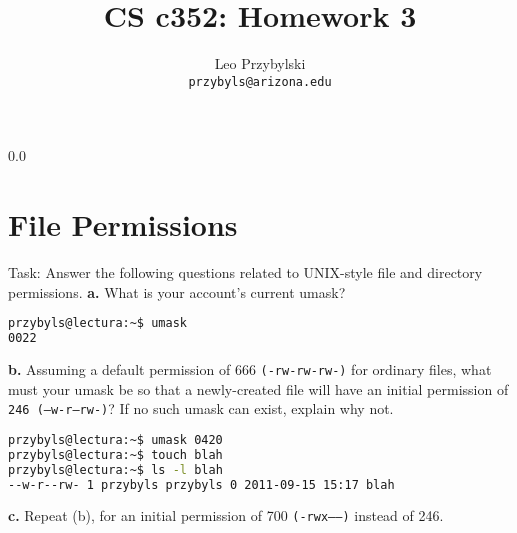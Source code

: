 \documentclass[11pt,notitlepage]{article}
\title{CS c352: Homework 3}
\author{Leo Przybylski\\
\texttt{przybyls@arizona.edu}}
\newcommand{\question}[2]{\textbf{#1.} #2}
\begin{document}
  \maketitle
  {\setlength{\baselineskip}%
           {0.0\baselineskip}
  \section*{File Permissions}
  \hrulefill \par}
Task: Answer the following questions related to UNIX-style ﬁle and directory permissions.
\question{a}{What is your account’s current umask?}

\begin{lstlisting}[language=bash,basicstyle=\scriptsize,backgroundcolor=\color{ubergray},caption={trnapp-config.xml},frame=single,breaklines=true]
przybyls@lectura:~$ umask
0022
\end{lstlisting}

\question{b}{Assuming a default permission of 666 \texttt{(-rw-rw-rw-)} for ordinary ﬁles, what must your umask
be so that a newly-created ﬁle will have an initial permission of \texttt{246 (--w-r--rw-)}? If no such
umask can exist, explain why not.}

\begin{lstlisting}[language=bash,basicstyle=\scriptsize,backgroundcolor=\color{ubergray},caption={trnapp-config.xml},frame=single,breaklines=true]
przybyls@lectura:~$ umask 0420
przybyls@lectura:~$ touch blah
przybyls@lectura:~$ ls -l blah
--w-r--rw- 1 przybyls przybyls 0 2011-09-15 15:17 blah
\end{lstlisting}

\question{c}{Repeat (b), for an initial permission of 700
  \texttt{(-rwx------)} instead of 246.}
\end{document}
